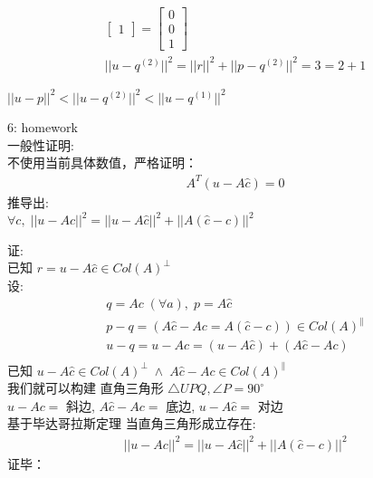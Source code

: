\documentclass[12pt]{article}
\begin{document}
\begin{flushleft}
\begin{align}
\begin{bmatrix}
                                           1
                                       \end{bmatrix} = \begin{bmatrix}
                                                           0 \\
                                                           0 \\
                                                           1
                                                       \end{bmatrix} \\
        ||u - q^{(2)}||^{2} = ||r||^{2}  +  ||p - q^{(2)}||^{2}
        = 3  =  2 + 1
    \end{align}

    $||u - p||^{2} < ||u - q^{(2)}||^{2} <||u - q^{(1)}||^{2} $


    6: homework \\
    一般性证明: \\
    不使用当前具体数值，严格证明： \\
    \begin{align}
        A^{T}(u  - A\hat{c}) = 0
    \end{align}
    推导出: \\
    $\forall c, \; ||u - Ac||^{2} = ||u - A\hat{c}||^{2} + ||A(\hat{c}-c)||^{2} $

    证:  \\
    已知 $ r = u - A\hat{c} \in Col(A)^{\perp}$ \\
    设:
    \begin{align}
        q = Ac \;(\forall a), \; p = A\hat{c}                           \\
        p - q  = (A\hat{c} - Ac = A(\hat{c} - c))\in Col(A)^{\parallel} \\
        u - q  = u - Ac = (u - A\hat{c}) +  (A\hat{c} - Ac )            \\
    \end{align}
    已知 $u - A\hat{c} \in  Col(A)^{\perp} \; \land \; A\hat{c} - Ac \in  Col(A)^{\parallel}$ \\
    我们就可以构建 直角三角形 $\triangle UPQ, \angle P=90^\circ $ \\
    $u - Ac = $ 斜边, $ A\hat{c} - Ac =$ 底边, $u - A\hat{c} = $ 对边 \\
    基于毕达哥拉斯定理 当直角三角形成立存在: \\
    \begin{align}
        ||u - Ac||^{2} = ||u - A\hat{c}||^{2} + ||A(\hat{c}-c)||^{2}
    \end{align}
    证毕：


\end{flushleft}
\end{document}
